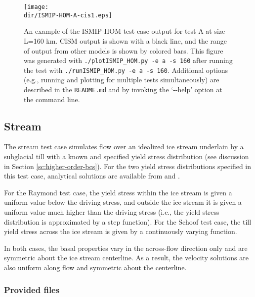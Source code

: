 \begin{figure}[H!]
	\centering
	\texttt{[image: \\dir/ISMIP-HOM-A-cis1.eps]}
	\caption{An example of the ISMIP-HOM test case output for test A at size L=160 km. 
CISM output is shown with a black line, and the range of output from other models is shown by colored bars. 
This figure was generated with \texttt{./plotISMIP\_HOM.py -e a -s 160} after running the test with \texttt{./runISMIP\_HOM.py -e a -s 160}.
Additional options (e.g., running and plotting for multiple tests simultaneously) are described in the \texttt{README.md} and by invoking the
`-{}-help' option at the command line.}
	\label{fig:ismiphom-results}
\end{figure}
\FloatBarrier

\subsection{Stream}
\label{sc:stream_test}
The stream test case simulates flow over an idealized ice stream underlain by a subglacial till with a known and specified
yield stress distribution (see discussion in Section \ref{sc:higher-order-bcs}). For the two yield stress distributions specified in this test case, 
analytical solutions are available from \citet{Raymond2000} and \citet{Schoof2006}. 

For the Raymond test case, the yield stress within the ice stream is given a uniform value below the driving stress, and outside the
ice stream it is given a uniform value much higher than the driving stress (i.e., the yield stress distribution is approximated by a
step function). For the Schoof test case, the till yield stress across the ice stream is given by a continuously varying function.

In both cases, the basal properties vary in the across-flow direction only and are symmetric about the ice stream centerline.
As a result, the velocity solutions are also uniform along flow and symmetric about the centerline.

\subsubsection{Provided files}

